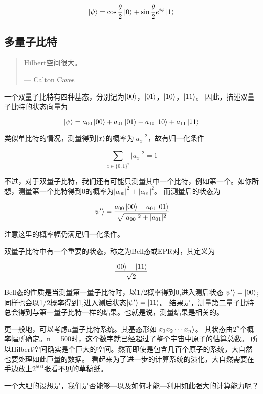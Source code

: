 \begin{equation}
\ket{\psi} = \cos\frac{\theta}{2}\ket{0} + \sin\frac{\theta}{2}e^{i\phi}\ket{1}
\end{equation}

\subsection{多量子比特}

\begin{quote}
Hilbert空间很大。

--- Calton Caves
\end{quote}

一个双量子比特有四种基态，分别记为$\ket{00}$，$\ket{01}$，$\ket{10}$，$\ket{11}$。
因此，描述双量子比特的状态向量为

\begin{equation}
\ket{\psi} = a_{00}\ket{00} + a_{01}\ket{01} + a_{10}\ket{10} + a_{11}\ket{11}
\end{equation}

类似单比特的情况，测量得到$\ket{x}$的概率为$|a_x|^2$，故有归一化条件

\begin{equation}
\sum_{x\in\{0,1\}^2}|a_x|^2 = 1
\end{equation}

不过，对于双量子比特，我们还有可能只测量其中一个比特，例如第一个。如你所想，测量第一个比特得到0的概率为$|a_{00}|^2 + |a_{01}|^2$。
而测量后的状态为

\begin{equation}
\ket{\psi'} = \frac{a_{00}\ket{00} + a_{01}\ket{01}}{\sqrt{|a_{00}|^2 + |a_{01}|^2}}
\end{equation}

注意这里的概率幅仍满足归一化条件。

双量子比特中有一个重要的状态，称之为Bell态或EPR对，其定义为

\begin{equation}
\frac{\ket{00} + \ket{11}}{\sqrt{2}}
\end{equation}

Bell态的性质是当测量第一量子比特时，以1/2概率得到0,进入测后状态$\ket{\psi'} = \ket{00}$;
同样也会以1/2概率得到1,进入测后状态$\ket{\psi'} = \ket{11}$。
结果是，测量第二量子比特总会得到与第一量子比特一样的结果。也就是说，测量结果是相关的。

更一般地，可以考虑n量子比特系统。其基态形如$\ket{x_1x_2\cdots x_n}$。
其状态由$2^n$个概率幅所确定。n = 500时，这个数字就已经超过了整个宇宙中原子的估算总数。
所以Hilbert空间确实是个巨大的空间。然而即使是包含几百个原子的系统，大自然也要处理如此巨量的数据。
看起来为了进一步的计算系统的演化，大自然需要在手边放上$2^{500}$张看不见的草稿纸。

一个大胆的设想是，我们是否能够---以及如何才能---利用如此强大的计算能力呢？

